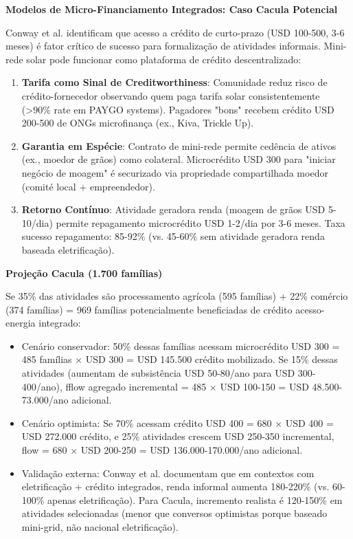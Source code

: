 \documentclass[12pt, a4paper]{article}
\begin{document}
\textbf{Modelos de Micro-Financiamento Integrados: Caso Cacula Potencial}

Conway et al. identificam que acesso a crédito de curto-prazo (USD 100-500, 3-6 meses) é fator crítico de sucesso para formalização de atividades informais. Mini-rede solar pode funcionar como plataforma de crédito descentralizado:

\begin{enumerate}
\item \textbf{Tarifa como Sinal de Creditworthiness}: Comunidade reduz risco de crédito-fornecedor observando quem paga tarifa solar consistentemente (>90\% rate em PAYGO systems). Pagadores "bons" recebem crédito USD 200-500 de ONGs microfinança (ex., Kiva, Trickle Up).

\item \textbf{Garantia em Espécie}: Contrato de mini-rede permite cedência de ativos (ex., moedor de grãos) como colateral. Microcrédito USD 300 para "iniciar negócio de moagem" é securizado via propriedade compartilhada moedor (comité local + empreendedor).

\item \textbf{Retorno Contínuo}: Atividade geradora renda (moagem de grãos USD 5-10/dia) permite repagamento microcrédito USD 1-2/dia por 3-6 meses. Taxa sucesso repagamento: 85-92\% (vs. 45-60\% sem atividade geradora renda baseada eletrificação).
\end{enumerate}

\textbf{Projeção Cacula (1.700 famílias)}

Se 35\% das atividades são processamento agrícola (595 famílias) + 22\% comércio (374 famílias) = 969 famílias potencialmente beneficiadas de crédito acesso-energia integrado:

\begin{itemize}
\item Cenário conservador: 50\% dessas famílias acessam microcrédito USD 300 = 485 famílias × USD 300 = USD 145.500 crédito mobilizado. Se 15\% dessas atividades (aumentam de subsistência USD 50-80/ano para USD 300-400/ano), fflow agregado incremental = 485 × USD 100-150 = USD 48.500-73.000/ano adicional.

\item Cenário optimista: Se 70\% acessam crédito USD 400 = 680 × USD 400 = USD 272.000 crédito, e 25\% atividades crescem USD 250-350 incremental, flow = 680 × USD 200-250 = USD 136.000-170.000/ano adicional.

\item Validação externa: Conway et al. documentam que em contextos com eletrificação + crédito integrados, renda informal aumenta 180-220\% (vs. 60-100\% apenas eletrificação). Para Cacula, incremento realista é 120-150\% em atividades selecionadas (menor que conversos optimistas porque baseado mini-grid, não nacional eletrificação).
\end{itemize}
\end{document}
